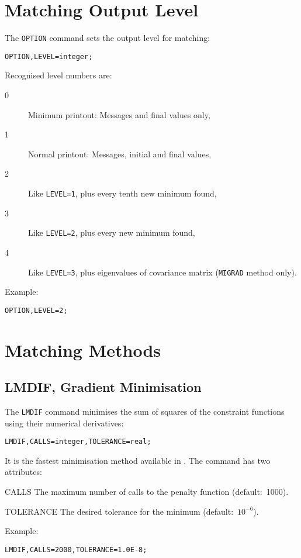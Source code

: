 \section{Matching Output Level}
\label{sec:matchoption}
The \texttt{OPTION} command sets the output level for matching:
\begin{verbatim}
OPTION,LEVEL=integer;
\end{verbatim}
Recognised level numbers are:
\begin{description}
\item[0]
Minimum printout: Messages and final values only,
\item[1]
Normal printout: Messages, initial and final values,
\item[2]
Like \texttt{LEVEL=1}, plus every tenth new minimum found,
\item[3]
Like \texttt{LEVEL=2}, plus every new minimum found,
\item[4]
Like \texttt{LEVEL=3}, plus eigenvalues of covariance matrix
(\texttt{MIGRAD} method only).
\end{description}
Example:
\begin{verbatim}
OPTION,LEVEL=2;
\end{verbatim}
 
\section{Matching Methods}
\label{sec:matchmethod}

\subsection{LMDIF, Gradient Minimisation}
The \texttt{LMDIF} command minimises the sum of squares of the constraint
functions using their numerical derivatives:
\begin{verbatim}
LMDIF,CALLS=integer,TOLERANCE=real;
\end{verbatim}
It is the fastest minimisation method available in \opal.
The command has two attributes:
\begin{description}
\item{CALLS}
  The maximum number of calls to the penalty function (default:~1000).
\item{TOLERANCE}
  The desired tolerance for the minimum (default:~\(10^{-6}\)).
\end{description}
Example:
\begin{verbatim}
LMDIF,CALLS=2000,TOLERANCE=1.0E-8;
\end{verbatim}


